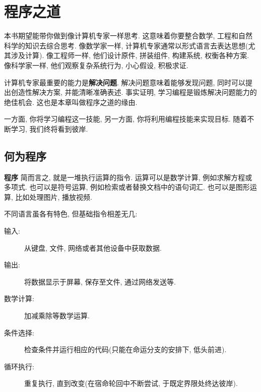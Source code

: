 \documentclass[10pt]{book}
\begin{document}
\begin{latexonly}

\tableofcontents

\clearemptydoublepage

\end{latexonly}

\mainmatter

\chapter{程序之道}

本书期望能带你做到像计算机专家一样思考. 
这意味着你要整合数学, 工程和自然科学的知识去综合思考. 
像数学家一样, 计算机专家通常以形式语言去表达思想(尤其涉及计算). 
像工程师一样, 他们设计原件, 拼装组件, 构建系统, 权衡各种方案. 
像科学家一样, 他们观察复杂系统行为, 小心假设, 积极求证. 

计算机专家最重要的能力是{\bf 解决问题}. 
解决问题意味着能够发现问题, 同时可以提出创造性解决方案, 并能清晰准确表述. 
事实证明, 学习编程是锻炼解决问题能力的绝佳机会. 
这也是本章叫做程序之道的缘由. 
 
一方面, 你将学习编程这一技能, 另一方面, 你将利用编程技能来实现目标. 
随着不断学习, 我们终将看到彼岸. 

\section{何为程序}

{\bf 程序} 简而言之, 就是一堆执行运算的指令. 
运算可以是数学计算, 例如求解方程或多项式. 
也可以是符号运算, 例如检索或者替换文档中的语句词汇. 
也可以是图形运算, 比如处理图片, 播放视频. 

不同语言虽各有特色, 但基础指令相差无几:

\begin{description}

\item[输入:] 从键盘, 文件, 网络或者其他设备中获取数据. 

\item[输出:] 将数据显示于屏幕, 保存至文件, 通过网络发送等. 

\item[数学计算:] 加减乘除等数学运算. 

\item[条件选择:] 检查条件并运行相应的代码(只能在命运分支的安排下, 低头前进). 

\item[循环执行:] 重复执行, 直到改变(在宿命轮回中不断尝试, 于既定界限处终达彼岸). 

\end{description}
\end{document}
